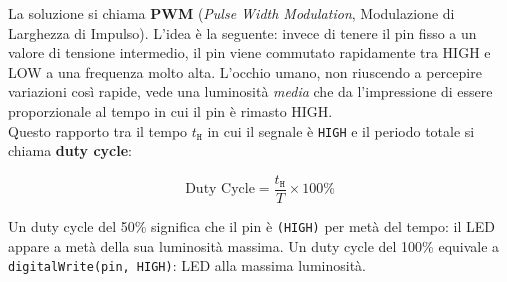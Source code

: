 La soluzione si chiama \textbf{PWM} (\textit{Pulse Width Modulation}, Modulazione di Larghezza di Impulso). L'idea è la seguente: invece di tenere il pin fisso a un valore di tensione intermedio, il pin viene commutato rapidamente tra HIGH e LOW a una frequenza molto alta. L'occhio umano, non riuscendo a percepire variazioni così rapide, vede una luminosità \textit{media} che da l'impressione di essere proporzionale al tempo in cui il pin è rimasto HIGH.\\

Questo rapporto tra il tempo $t_{\texttt{H}}$ in cui il segnale è \texttt{HIGH} e il periodo totale si chiama 
\textbf{duty cycle}:

\begin{equation}
    \text{Duty Cycle} = \frac{t_{\texttt{H}}}{T} \times 100\%
\end{equation}

Un duty cycle del 50\% significa che il pin è \texttt{(HIGH)} per metà del tempo: il LED appare a metà della sua luminosità massima. Un duty cycle del 100\% equivale a \texttt{digitalWrite(pin, HIGH)}: LED alla massima luminosità.

\begin{center}
\end{center}

